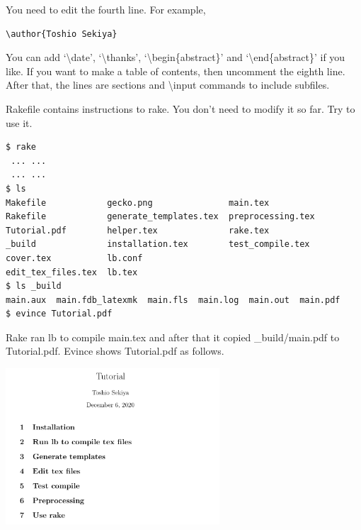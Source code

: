 You need to edit the fourth line.
For example,
\begin{verbatim}
\author{Toshio Sekiya}
\end{verbatim}
You can add `{\textbackslash}date', `{\textbackslash}thanks', `{\textbackslash}begin\{abstract\}' and `{\textbackslash}end\{abstract\}' if you like.
If you want to make a table of contents, then uncomment the eighth line.
After that, the lines are sections and {\textbackslash}input commands to include subfiles.

Rakefile contains instructions to rake.
You don't need to modify it so far.
Try to use it.
\begin{verbatim}
$ rake
 ... ...
 ... ...
$ ls
Makefile            gecko.png               main.tex
Rakefile            generate_templates.tex  preprocessing.tex
Tutorial.pdf        helper.tex              rake.tex
_build              installation.tex        test_compile.tex
cover.tex           lb.conf
edit_tex_files.tex  lb.tex
$ ls _build
main.aux  main.fdb_latexmk  main.fls  main.log  main.out  main.pdf
$ evince Tutorial.pdf
\end{verbatim}
Rake ran lb to compile main.tex and after that it copied \_build/main.pdf to Tutorial.pdf.
Evince shows Tutorial.pdf as follows.
\begin{center}
\includegraphics[width=8cm]{Tutorial_1.png}
\end{center}

